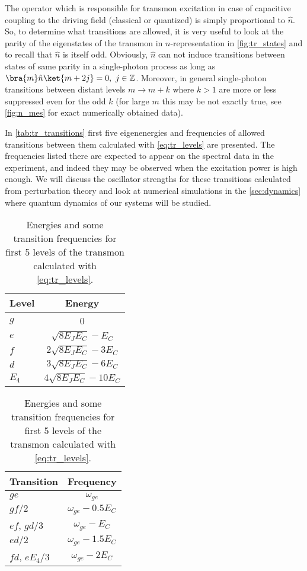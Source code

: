 The operator which is responsible for transmon excitation in case of capacitive coupling to the driving field (classical or quantized) is simply proportional to $\hat n$\cite{Koch2007}. So, to determine what transitions are allowed, it is very useful to look at the parity of the eigenstates of the transmon in $n$-representation in \autoref{fig:tr_states} and to recall that $\hat n$ is itself odd. Obviously, $\hat n$ can not induce transitions between states of same parity in a single-photon process as long as $\bra{m}\hat n\ket{m+2j} = 0,\ j\in\mathbb{Z}$. Moreover, in general single-photon transitions between distant levels $m\rightarrow m+k$ where $k>1$ are more or less suppressed\cite{Bishop2010} even for the odd $k$ (for large $m$ this may be not exactly true, see \autoref{fig:n_mes} for exact numerically obtained data). 

In \autoref{tab:tr_transitions} first five eigenenergies and frequencies of allowed transitions between them calculated with \eqref{eq:tr_levels} are presented. The frequencies listed there are expected to appear on the spectral data in the experiment, and indeed they may be observed when the excitation power is high enough. We will discuss the oscillator strengths for these transitions calculated from perturbation theory and look at numerical simulations in the \autoref{sec:dynamics} where quantum dynamics of our systems will be studied.

\begin{table}
\centering
\begin{tabular}{l|c}
Level & Energy\\
\hline
$g$ & 0\\
$e$ & $\sqrt{8E_J E_C} - E_C$\\
$f$ & $2\sqrt{8E_J E_C} - 3 E_C$\\
$d$ & $3\sqrt{8E_J E_C} - 6 E_C$\\
$E_4$ & $4\sqrt{8E_J E_C} - 10 E_C$\\
\hline
\end{tabular}\quad
\begin{tabular}{l|c}
Transition & Frequency\\
\hline
$ge$ & $\omega_{ge}$ \\
$gf/2$ & $\omega_{ge} - 0.5 E_C$\\
$ef$, $gd/3$& $\omega_{ge}-E_C$\\
$ed/2$ & $\omega_{ge} - 1.5 E_C$\\
$fd$, $e E_4/3$ & $\omega_{ge}-2 E_C$\\
\hline
\end{tabular}
\caption{Energies and some transition frequencies for first 5 levels of the transmon calculated with \eqref{eq:tr_levels}.}
\label{tab:tr_transitions}
\end{table}

